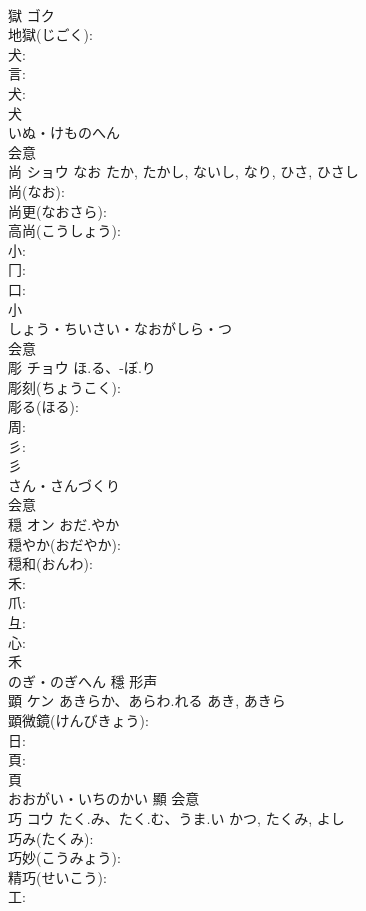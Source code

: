 \documentclass[8pt]{extreport}
\begin{document}
\begin{CJK}{UTF8}{min}
\\	獄	ゴク			
\\	地獄(じごく): 
\\	犬: 
\\	言: 
\\	犬: 
\\	犬	
\\	いぬ・けものへん	
\\	会意 
\\	尚	ショウ	なお	たか, たかし, ないし, なり, ひさ, ひさし	
\\	尚(なお): 
\\	尚更(なおさら): 
\\	高尚(こうしょう): 
\\	小: 
\\	冂: 
\\	口: 
\\	小	
\\	しょう・ちいさい・なおがしら・つ	
\\	会意 
\\	彫	チョウ	ほ.る、-ぼ.り		
\\	彫刻(ちょうこく): 
\\	彫る(ほる): 
\\	周: 
\\	彡: 
\\	彡	
\\	さん・さんづくり	
\\	会意 
\\	穏	オン	おだ.やか		
\\	穏やか(おだやか): 
\\	穏和(おんわ): 
\\	禾: 
\\	爪: 
\\	彑: 
\\	心: 
\\	禾	
\\	のぎ・のぎへん	穩	形声 
\\	顕	ケン	あきらか、あらわ.れる	あき, あきら	
\\	顕微鏡(けんびきょう): 
\\	日: 
\\	頁: 
\\	頁	
\\	おおがい・いちのかい	顯	会意 
\\	巧	コウ	たく.み、たく.む、うま.い	かつ, たくみ, よし	
\\	巧み(たくみ): 
\\	巧妙(こうみょう): 
\\	精巧(せいこう): 
\\	工: 

\end{CJK}
\end{document}
